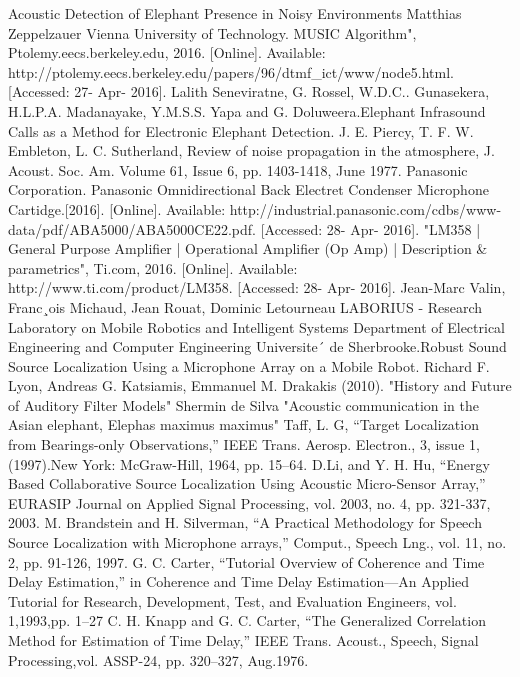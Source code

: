 \documentclass[12pt]{article}
\numberwithin{figure}{section}
\numberwithin{table}{section}
\begin{document}
\begin{thebibliography}{1}
 Acoustic Detection of Elephant Presence in Noisy Environments Matthias Zeppelzauer Vienna University of Technology.
 MUSIC Algorithm", Ptolemy.eecs.berkeley.edu, 2016. [Online]. Available: http://ptolemy.eecs.berkeley.edu/papers/96/dtmf\_ict/www/node5.html. [Accessed: 27- Apr- 2016].
 Lalith Seneviratne, G. Rossel, W.D.C.. Gunasekera, H.L.P.A. Madanayake, Y.M.S.S. Yapa and G. Doluweera.Elephant Infrasound Calls as a Method for Electronic Elephant Detection.
 J. E. Piercy, T. F. W. Embleton, L. C. Sutherland, Review of noise propagation in the atmosphere, J. Acoust. Soc. Am. Volume 61, Issue 6, pp. 1403-1418, June 1977.
 Panasonic Corporation. Panasonic Omnidirectional Back Electret Condenser Microphone Cartidge.[2016].  [Online]. Available: http://industrial.panasonic.com/cdbs/www-data/pdf/ABA5000/ABA5000CE22.pdf. [Accessed: 28- Apr- 2016].
"LM358 | General Purpose Amplifier | Operational Amplifier (Op Amp) | Description \& parametrics", Ti.com, 2016. [Online]. Available: http://www.ti.com/product/LM358. [Accessed: 28- Apr- 2016].
Jean-Marc Valin, Franc¸ois Michaud, Jean Rouat, Dominic Letourneau LABORIUS - Research Laboratory on Mobile Robotics and Intelligent Systems Department of Electrical Engineering and Computer Engineering Universite´ de Sherbrooke.Robust Sound Source Localization Using a Microphone Array on a Mobile Robot.
 Richard F. Lyon, Andreas G. Katsiamis, Emmanuel M. Drakakis (2010). "History and Future of Auditory Filter Models"
 Shermin de Silva "Acoustic communication in the Asian elephant,
Elephas maximus maximus"
 Taff, L. G, “Target Localization from Bearings-only Observations,”
IEEE Trans. Aerosp. Electron., 3, issue 1, (1997).New York: McGraw-Hill, 1964, pp. 15–64.
D.Li, and Y. H. Hu, “Energy Based Collaborative Source Localization
Using Acoustic Micro-Sensor Array,” EURASIP Journal on Applied
Signal Processing, vol. 2003, no. 4, pp. 321-337, 2003.
M. Brandstein and H. Silverman, “A Practical Methodology for Speech
Source Localization with Microphone arrays,” Comput., Speech Lng.,
vol. 11, no. 2, pp. 91-126, 1997.
 G. C. Carter, “Tutorial Overview of Coherence and Time Delay Estimation,”
in Coherence and Time Delay Estimation—An Applied Tutorial for Research, Development, Test, and Evaluation Engineers, vol. 1,1993,pp. 1–27
C. H. Knapp and G. C. Carter, “The Generalized Correlation Method for Estimation of Time Delay,” IEEE Trans. Acoust., Speech, Signal Processing,vol. ASSP-24, pp. 320–327, Aug.1976.

\end{thebibliography}
\end{document}
